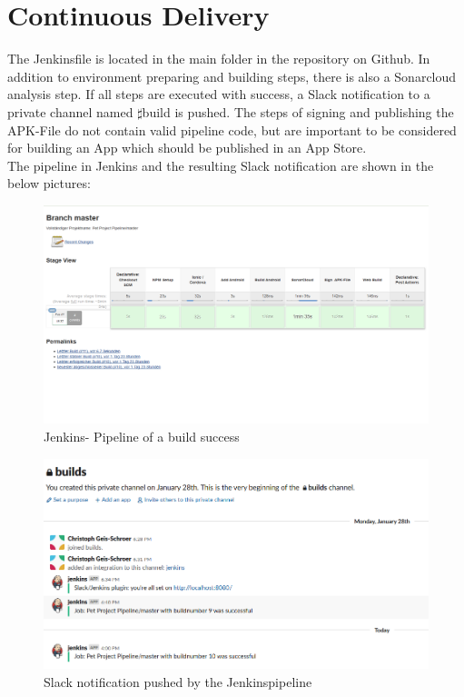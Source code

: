 \documentclass[12pt]{article}
\begin{document}
\section{Continuous Delivery}

The Jenkinsfile is located in the main folder in the repository on Github. In addition to environment preparing and building steps, there is also a Sonarcloud analysis step. If all steps are executed with success, a Slack notification to a private channel named $ \sharp$build is pushed. The steps of signing and publishing the APK-File do not contain valid pipeline code, but are important to be considered for building an App which should be published in an App Store.\\
The pipeline in Jenkins and the resulting Slack notification are shown in the below pictures:
\begin{figure}[H]
 \includegraphics[width=\linewidth]{figures/Jenkins_Pipeline.PNG}
 \caption{Jenkins- Pipeline of a build success}\label{fig:awesome_image1}
\end{figure}
\begin{figure}[H]
 \includegraphics[width=\linewidth]{figures/Slack_Notification.PNG}
 \caption{Slack notification pushed by the Jenkinspipeline}\label{fig:awesome_image1}
\end{figure}
\end{document}

